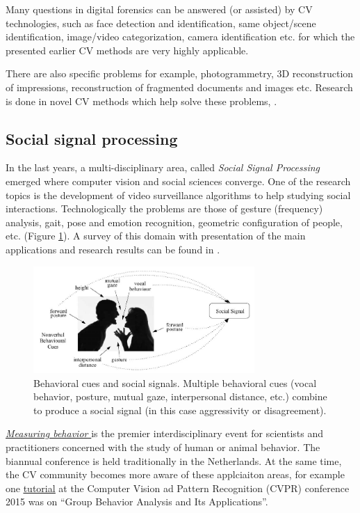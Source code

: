 Many questions in digital forensics can be answered (or assisted) by CV technologies, such as face detection and identification, same object/scene identification, image/video categorization, camera identification etc. for which the presented earlier CV methods are very highly applicable.

There are also specific problems for example, photogrammetry, 3D  reconstruction  of  impressions, reconstruction of fragmented documents and images etc. Research is done in novel CV methods which help solve these problems, \cite{Andalo13SIBGRAPI}.

\subsection{Social signal processing}
In the last years, a multi-disciplinary area, called {\em Social  Signal  Processing} emerged where computer vision and social sciences converge.  One of the research topics is the development of video surveillance  algorithms to help studying social interactions. Technologically the problems are those of gesture (frequency) analysis, gait, pose and emotion recognition, geometric configuration of people, etc. (Figure \ref{fig:SSP}). A survey of this domain with presentation of the main applications and research results can be found in \cite{Vinciarelli:2009}. 

\begin{figure}[H]
\begin{center}
\includegraphics[width=0.75\textwidth]{fig/SSP}
\end{center}
\caption{Behavioral cues and social signals. Multiple behavioral cues (vocal behavior, posture, mutual gaze, interpersonal distance, etc.) combine to produce a social signal
(in this case aggressivity or disagreement).}
\label{fig:SSP}
\end{figure}


\href{http://www.measuringbehavior.org/}{\underline{\em Measuring behavior }} is the premier interdisciplinary event for scientists and practitioners concerned with the study of human or animal behavior. The biannual conference is held traditionally in the Netherlands. At the same time, the CV community becomes more aware of these applciaiton areas, for example one \href{http://www.seas.upenn.edu/~hypar/GroupBehavior/cvpr15_tutorial_group_behavior.html}{\underline{tutorial}} at the Computer Vision ad Pattern Recognition (CVPR) conference 2015 was on ``Group Behavior Analysis and Its Applications''.